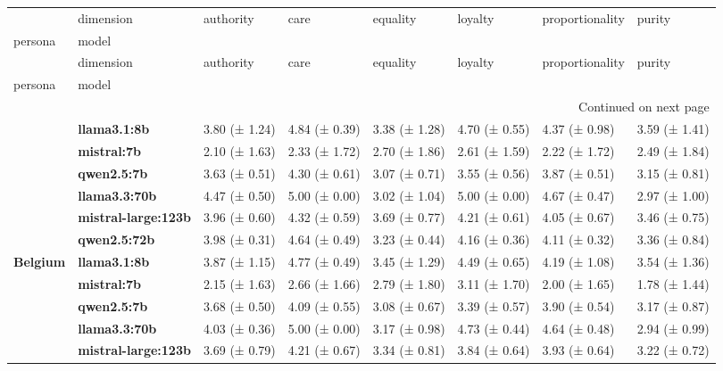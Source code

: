 \begin{longtable}{llllllll}
\toprule
 & dimension & authority & care & equality & loyalty & proportionality & purity \\
persona & model &  &  &  &  &  &  \\
\midrule
\endfirsthead
\toprule
 & dimension & authority & care & equality & loyalty & proportionality & purity \\
persona & model &  &  &  &  &  &  \\
\midrule
\endhead
\midrule
\multicolumn{8}{r}{Continued on next page} \\
\midrule
\endfoot
\bottomrule
\endlastfoot
\multirow[t]{6}{*}{\textbf{Argentina}} & \textbf{llama3.1:8b} & 3.80 (± 1.24) & 4.84 (± 0.39) & 3.38 (± 1.28) & 4.70 (± 0.55) & 4.37 (± 0.98) & 3.59 (± 1.41) \\
\textbf{} & \textbf{mistral:7b} & 2.10 (± 1.63) & 2.33 (± 1.72) & 2.70 (± 1.86) & 2.61 (± 1.59) & 2.22 (± 1.72) & 2.49 (± 1.84) \\
\textbf{} & \textbf{qwen2.5:7b} & 3.63 (± 0.51) & 4.30 (± 0.61) & 3.07 (± 0.71) & 3.55 (± 0.56) & 3.87 (± 0.51) & 3.15 (± 0.81) \\
\textbf{} & \textbf{llama3.3:70b} & 4.47 (± 0.50) & 5.00 (± 0.00) & 3.02 (± 1.04) & 5.00 (± 0.00) & 4.67 (± 0.47) & 2.97 (± 1.00) \\
\textbf{} & \textbf{mistral-large:123b} & 3.96 (± 0.60) & 4.32 (± 0.59) & 3.69 (± 0.77) & 4.21 (± 0.61) & 4.05 (± 0.67) & 3.46 (± 0.75) \\
\textbf{} & \textbf{qwen2.5:72b} & 3.98 (± 0.31) & 4.64 (± 0.49) & 3.23 (± 0.44) & 4.16 (± 0.36) & 4.11 (± 0.32) & 3.36 (± 0.84) \\
\cline{1-8}
\multirow[t]{6}{*}{\textbf{Belgium}} & \textbf{llama3.1:8b} & 3.87 (± 1.15) & 4.77 (± 0.49) & 3.45 (± 1.29) & 4.49 (± 0.65) & 4.19 (± 1.08) & 3.54 (± 1.36) \\
\textbf{} & \textbf{mistral:7b} & 2.15 (± 1.63) & 2.66 (± 1.66) & 2.79 (± 1.80) & 3.11 (± 1.70) & 2.00 (± 1.65) & 1.78 (± 1.44) \\
\textbf{} & \textbf{qwen2.5:7b} & 3.68 (± 0.50) & 4.09 (± 0.55) & 3.08 (± 0.67) & 3.39 (± 0.57) & 3.90 (± 0.54) & 3.17 (± 0.87) \\
\textbf{} & \textbf{llama3.3:70b} & 4.03 (± 0.36) & 5.00 (± 0.00) & 3.17 (± 0.98) & 4.73 (± 0.44) & 4.64 (± 0.48) & 2.94 (± 0.99) \\
\textbf{} & \textbf{mistral-large:123b} & 3.69 (± 0.79) & 4.21 (± 0.67) & 3.34 (± 0.81) & 3.84 (± 0.64) & 3.93 (± 0.64) & 3.22 (± 0.72) \\

\end{longtable}
